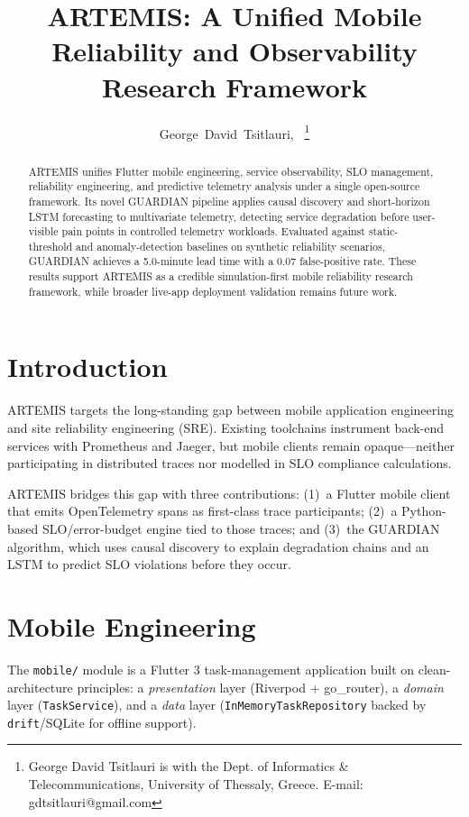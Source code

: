 \documentclass[10pt,journal]{IEEEtran}
\title{ARTEMIS: A Unified Mobile Reliability and Observability Research Framework}
\author{George~David~Tsitlauri,~\IEEEmembership{}
  \thanks{George David Tsitlauri is with the Dept. of Informatics \& Telecommunications, University of Thessaly, Greece. E-mail: gdtsitlauri@gmail.com}}
\begin{document}
\maketitle

\begin{abstract}
ARTEMIS unifies Flutter mobile engineering, service observability, SLO
management, reliability engineering, and predictive telemetry analysis under a
single open-source framework. Its novel GUARDIAN pipeline applies causal
discovery and short-horizon LSTM forecasting to multivariate telemetry, detecting
service degradation before user-visible pain points in controlled telemetry
workloads. Evaluated against static-threshold and anomaly-detection baselines on
synthetic reliability scenarios, GUARDIAN achieves a 5.0-minute lead time with
a 0.07 false-positive rate. These results support ARTEMIS as a credible
simulation-first mobile reliability research framework, while broader live-app
deployment validation remains future work.
\end{abstract}

\section{Introduction}
ARTEMIS targets the long-standing gap between mobile application engineering and
site reliability engineering (SRE). Existing toolchains instrument back-end
services with Prometheus and Jaeger, but mobile clients remain opaque---neither
participating in distributed traces nor modelled in SLO compliance calculations.

ARTEMIS bridges this gap with three contributions: (1)~a Flutter mobile client
that emits OpenTelemetry spans as first-class trace participants; (2)~a
Python-based SLO/error-budget engine tied to those traces; and (3)~the GUARDIAN
algorithm, which uses causal discovery to explain degradation chains and an LSTM
to predict SLO violations before they occur.

\section{Mobile Engineering}
\label{sec:mobile}

The \texttt{mobile/} module is a Flutter 3 task-management application built on
clean-architecture principles: a \emph{presentation} layer (Riverpod +
go\_router), a \emph{domain} layer (\texttt{TaskService}), and a \emph{data}
layer (\texttt{InMemoryTaskRepository} backed by \texttt{drift}/SQLite for
offline support).
\end{document}
